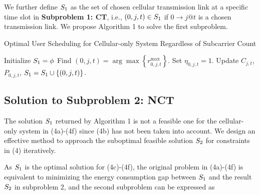\documentclass{ieeeaccess}
\begin{document}
We further define ${{\bf{S}}_{\bf{1}}}$ as the set of chosen cellular transmission link at a specific time slot in \textbf{Subproblem 1: CT}, i.e., $\left( {0,j,t} \right) \in {\bf{S}}_{\bf{1}}$ if $0 \to j@t$ is a chosen transmission link. We propose Algorithm 1 to solve the first subproblem.

\begin{algorithm}[h]
\caption{Optimal User Scheduling for Cellular-only System Regardless of Subcarrier Count}
\label{alg:1}
\begin{algorithmic}[1]
\STATE Initialize ${{\bf{S}}_{\bf{1}}}=\phi$
    \STATE Find $\left( {0,j,t} \right) = \arg \max \left\{ {r_{0,j,t}^{\max }} \right\}$.
    \STATE Set ${\eta _{0,j,t}} = 1$.
    \STATE Update ${C_{j,t}}$, ${P_{0,j,t}}$, ${{\bf{S}}_{\bf{1}}}={{\bf{S}}_{\bf{1}}} \cup \left\{ {\left( {0,j,t} \right)} \right\}$.
  \ENDWHILE
\ENDFOR
\end{algorithmic}
\end{algorithm}

\subsection{Solution to \textbf{Subproblem 2: NCT}}

The solution ${{\bf{S}}_{\bf{1}}}$ returned by Algorithm 1 is not a feasible one for the cellular-only system in (4a)-(4f) since (4b) has not been taken into account. We design an effective method to approach the suboptimal feasible solution ${{\bf{S}}_{\bf{2}}}$ for constraints in (4) iteratively.

As ${{\bf{S}}_{\bf{1}}}$ is the optimal solution for (4c)-(4f), the original problem in (4a)-(4f) is equivalent to minimizing the energy consumption gap between ${{\bf{S}}_{\bf{1}}}$ and the result ${{\bf{S}}_{\bf{2}}}$ in subproblem 2, and the second subproblem can be expressed as
\end{document}
